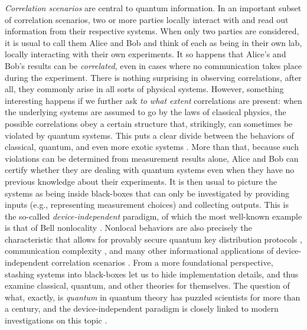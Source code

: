 \emph{Correlation scenarios} are central to quantum information. In an important subset of correlation scenarios, two or more parties locally interact with and read out information from their respective systems. When only two parties are considered, it is usual to call them Alice and Bob and think of each as being in their own lab, locally interacting with their own experiments. It so happens that Alice's and Bob's results can be \emph{correlated}, even in cases where no communication takes place during the experiment. There is nothing surprising in observing correlations, after all, they commonly arise in all sorts of physical systems. However, something interesting happens if we further ask \emph{to what extent} correlations are present: when the underlying systems are assumed to go by the laws of classical physics, the possible correlations obey a certain structure that, strikingly, can sometimes be violated by quantum systems. This puts a clear divide between the behaviors of classical, quantum, and even more exotic systems \cite{prbox}. More than that, because such violations can be determined from measurement results alone, Alice and Bob can certify whether they are dealing with quantum systems even when they have no previous knowledge about their experiments. It is then usual to picture the systems as being inside black-boxes that can only be investigated by providing inputs (e.g., representing measurement choices) and collecting outputs. This is the so-called \emph{device-independent} paradigm, of which the most well-known example is that of Bell nonlocality \cite{brunner_2014_nonlocality}. %
Nonlocal behaviors are also precisely the characteristic that allows for provably secure quantum key distribution protocols \cite{ekert91}, communication complexity \cite{buhrman_communicationreview_2010}, and many other informational applications of device-independent correlation scenarios \cite{brunner_2014_nonlocality}. From a more foundational perspective, stashing systems into black-boxes let us to hide implementation details, and thus examine classical, quantum, and other theories for themselves. The question of what, exactly, is \emph{quantum} in quantum theory has puzzled scientists for more than a century, and the device-independent paradigm is closely linked to modern investigations on this topic \cite{barrett_gpts_2007,plavala_gpts_2021,spekkens_2005_contextuality}.  

